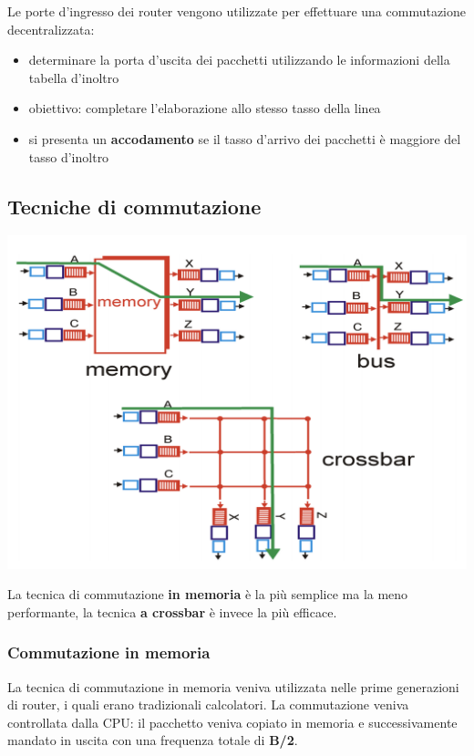 \documentclass{report}
\begin{document}
Le porte d'ingresso dei router vengono utilizzate per effettuare una
commutazione decentralizzata:

\begin{itemize}
\item
  determinare la porta d'uscita dei pacchetti utilizzando le
  informazioni della tabella d'inoltro
\item
  obiettivo: completare l'elaborazione allo stesso tasso della linea
\item
  si presenta un \textbf{accodamento} se il tasso d'arrivo dei pacchetti
  è maggiore del tasso d'inoltro
\end{itemize}

\hypertarget{header-n67}{%
\subsection{Tecniche di commutazione}\label{header-n67}}

\begin{center}
		\includegraphics[width=0.7\linewidth]{commutazione}
	\end{center}

La tecnica di commutazione \textbf{in memoria} è la più semplice ma la
meno performante, la tecnica \textbf{a crossbar} è invece la più
efficace.

\hypertarget{header-n70}{%
\subsubsection{Commutazione in memoria}\label{header-n70}}

La tecnica di commutazione in memoria veniva utilizzata nelle prime
generazioni di router, i quali erano tradizionali calcolatori. La
commutazione veniva controllata dalla CPU: il pacchetto veniva copiato
in memoria e successivamente mandato in uscita con una frequenza totale
di \textbf{B/2}.
\end{document}
